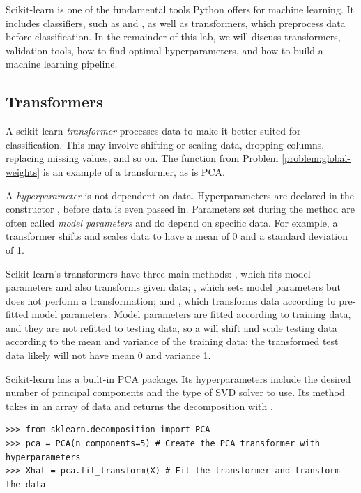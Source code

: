 Scikit-learn is one of the fundamental tools Python offers for machine learning.
It includes classifiers, such as  and , as well as transformers, which preprocess data before classification.
In the remainder of this lab, we will discuss transformers, validation tools, how to find optimal hyperparameters, and how to build a machine learning pipeline.

\subsection*{Transformers} %

A scikit-learn \emph{transformer} processes data to make it better suited for classification.
This may involve shifting or scaling data, dropping columns, replacing missing values, and so on.
The function from Problem \ref{problem:global-weights} is an example of a transformer, as is PCA.

\begin{info}
A \emph{hyperparameter} is not dependent on data.
Hyperparameters are declared in the constructor , before data is even passed in.
Parameters set during the  method are often called \emph{model parameters} and do depend on specific data.
For example, a  transformer shifts and scales data to have a mean of 0 and a standard deviation of 1.

Scikit-learn's transformers have three main methods: , which fits model parameters and also transforms given data; , which sets model parameters but does not perform a transformation; and , which transforms data according to pre-fitted model parameters.
Model parameters are fitted according to training data, and they are not refitted to testing data, so a  will shift and scale testing data according to the mean and variance of the training data; the transformed test data likely will not have mean 0 and variance 1.
\end{info}

Scikit-learn has a built-in PCA package.
Its hyperparameters include the desired number of principal components and the type of SVD solver to use.
Its  method takes in an array of data and returns the decomposition with .

\begin{lstlisting}
>>> from sklearn.decomposition import PCA 
>>> pca = PCA(n_components=5) # Create the PCA transformer with hyperparameters
>>> Xhat = pca.fit_transform(X) # Fit the transformer and transform the data
\end{lstlisting}

